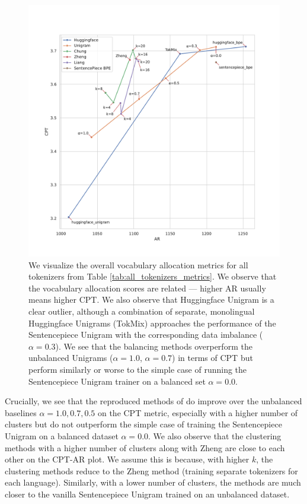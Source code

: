 \begin{figure}[H]
    \centering
    \includegraphics[width=\textwidth]{figures/all_tokenizers_AR_vs_CPT.pdf}
    \caption{We visualize the overall vocabulary allocation metrics for all tokenizers from Table \ref{tab:all_tokenizers_metrics}. We observe that the vocabulary allocation scores are related --- higher AR usually means higher CPT.  We also observe that Huggingface Unigram is a clear outlier, although a combination of separate, monolingual Huggingface Unigrams (TokMix) approaches the performance of the Sentencepiece Unigram with the corresponding data imbalance ($\alpha=0.3$). We see that the balancing methods overperform the unbalanced Unigrams ($\alpha=1.0$, $\alpha=0.7$) in terms of CPT but perform similarly or worse to the simple case of running the Sentencepiece Unigram trainer on a balanced set $\alpha=0.0$.}
    \label{fig:all_tokenizers_AR_vs_CPT}
\end{figure}

Crucially, we see that the reproduced methods of \citet{chung_improving_2020,zheng_allocating_2021,liang_xlm-v_2023} do improve over the unbalanced baselines $\alpha=1.0, 0.7, 0.5$ on the CPT metric, especially with a higher number of clusters but do not outperform the simple case of training the Sentencepiece Unigram on a balanced dataset $\alpha=0.0$. We also observe that the clustering methods with a higher number of clusters along with Zheng are close to each other on the CPT-AR plot. We assume this is because, with higher $k$, the clustering methods reduce to the Zheng method (training separate tokenizers for each language). Similarly, with a lower number of clusters, the methods are much closer to the vanilla Sentencepiece Unigram trained on an unbalanced dataset.

